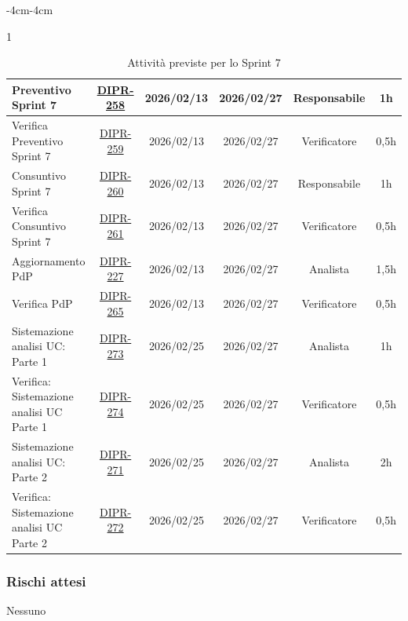 \documentclass[a4paper,12pt]{article}
\begin{document}
\begin{table}[H]
\begin{adjustwidth}{-4cm}{-4cm}
\begin{spacing}{1}
\begin{tabular}{|p{4cm}|c|c|c|c|c|}
        \hline
        Preventivo Sprint 7 & \href{https://7zpus.atlassian.net/browse/DIPR-258}{DIPR-258} & 2026/02/13 & 2026/02/27 & Responsabile & 1h \\
        \hline
        Verifica Preventivo Sprint 7 & \href{https://7zpus.atlassian.net/browse/DIPR-259}{DIPR-259} & 2026/02/13 & 2026/02/27 & Verificatore & 0,5h \\
        \hline
        Consuntivo Sprint 7 & \href{https://7zpus.atlassian.net/browse/DIPR-260}{DIPR-260} & 2026/02/13 & 2026/02/27 & Responsabile & 1h \\
        \hline
        Verifica Consuntivo Sprint 7 & \href{https://7zpus.atlassian.net/browse/DIPR-261}{DIPR-261} & 2026/02/13 & 2026/02/27 & Verificatore & 0,5h \\
        \hline
        Aggiornamento PdP & \href{https://7zpus.atlassian.net/browse/DIPR-227}{DIPR-227} & 2026/02/13 & 2026/02/27 & Analista & 1,5h \\
        \hline
        Verifica PdP & \href{https://7zpus.atlassian.net/browse/DIPR-265}{DIPR-265} & 2026/02/13 & 2026/02/27 & Verificatore & 0,5h \\
        \hline
        Sistemazione analisi UC: Parte 1 & \href{https://7zpus.atlassian.net/browse/DIPR-273}{DIPR-273} & 2026/02/25 & 2026/02/27 & Analista & 1h \\
        \hline
        Verifica: Sistemazione analisi UC Parte 1 & \href{https://7zpus.atlassian.net/browse/DIPR-274}{DIPR-274} & 2026/02/25 & 2026/02/27 & Verificatore & 0,5h \\
        \hline
        Sistemazione analisi UC: Parte 2 & \href{https://7zpus.atlassian.net/browse/DIPR-271}{DIPR-271} & 2026/02/25 & 2026/02/27 & Analista & 2h \\
        \hline
        Verifica: Sistemazione analisi UC Parte 2 & \href{https://7zpus.atlassian.net/browse/DIPR-272}{DIPR-272} & 2026/02/25 & 2026/02/27 & Verificatore & 0,5h \\
        \hline

    \end{tabular}
    \end{spacing}
    \caption{Attività previste per lo Sprint 7}
    \end{adjustwidth}
\end{table}

\subsubsection{Rischi attesi}
Nessuno
\end{document}
